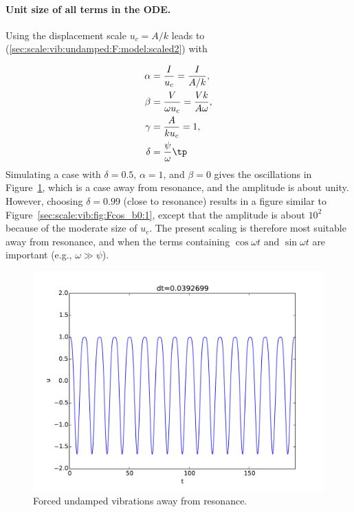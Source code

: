 \documentclass[graybox,envcountchap,sectrefs,final]{svmonodo}
\begin{document}
\paragraph{Unit size of all terms in the ODE.}
Using the displacement scale $u_c=A/k$ leads to
(\ref{sec:scale:vib:undamped:F:model:scaled2}) with

\begin{align*}
\alpha &= \frac{I}{u_c} = \frac{I}{A/k},\\ 
\beta  &= \frac{V}{\omega u_c} = \frac{V k}{A\omega},\\ 
\gamma &= \frac{A}{ku_c} = 1,\\ 
\delta &= \frac{\psi}{\omega}\tp
\end{align*}
Simulating a case with $\delta=0.5$, $\alpha=1$, and $\beta=0$ gives
the oscillations in Figure~\ref{sec:scale:vib:fig:Fcos_b0:2}, which is
a case away from resonance, and the amplitude is about unity. However,
choosing $\delta =0.99$ (close to resonance) results in a figure
similar to Figure~\ref{sec:scale:vib:fig:Fcos_b0:1}, except that the
amplitude is about $10^2$ because of the moderate size of $u_c$.
The present scaling is therefore most suitable away from resonance,
and when the terms containing $\cos\omega t$ and $\sin\omega t$
are important (e.g., $\omega\gg\psi$).


\begin{figure}[!ht]  %
  \centerline{\includegraphics[width=1.0\linewidth]{fig-scaling/vib_delta05_b0_Fcos.pdf}}
  \caption{
  Forced undamped vibrations away from resonance. \label{sec:scale:vib:fig:Fcos_b0:2}
  }
\end{figure}
\end{document}
